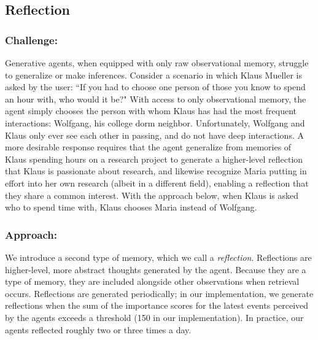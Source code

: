 \subsection{Reflection}



\subsubsection*{Challenge:} Generative agents, when equipped with only raw observational memory, struggle to generalize or make inferences. Consider a scenario in which Klaus Mueller is asked by the user: ``If you had to choose one person of those you know to spend an hour with, who would it be?" With access to only observational memory, the agent simply chooses the person with whom Klaus has had the most frequent interactions: Wolfgang, his college dorm neighbor. Unfortunately, Wolfgang and Klaus only ever see each other in passing, and do not have deep interactions. A more desirable response requires that the agent generalize from memories of Klaus spending hours on a research project to generate a higher-level reflection that Klaus is passionate about research, and likewise recognize Maria putting in effort into her own research (albeit in a different field), enabling a reflection that they share a common interest. With the approach below, when Klaus is asked who to spend time with, Klaus chooses Maria instead of Wolfgang. 

\subsubsection*{Approach: } We introduce a second type of memory, which we call a \textit{reflection}. Reflections are higher-level, more abstract thoughts generated by the agent. Because they are a type of memory, they are included alongside other observations when retrieval occurs. Reflections are generated periodically; in our implementation, we generate reflections when the sum of the importance scores for the latest events perceived by the agents exceeds a threshold (150 in our implementation). In practice, our agents reflected roughly two or three times a day.

